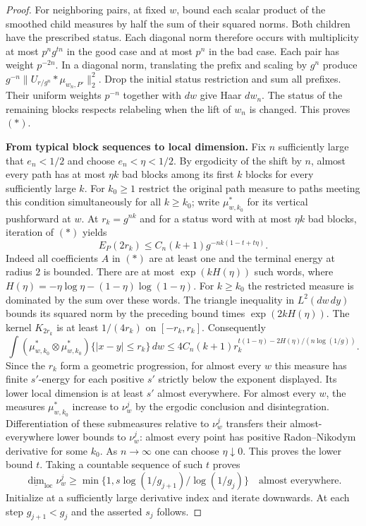 \documentclass[11pt,a4paper]{article}
\begin{document}
\begin{proof}
For neighboring pairs, at fixed $w$, bound each scalar product
of the smoothed child measures by half the sum of their squared
norms. Both children have the prescribed status. Each diagonal
norm therefore occurs with multiplicity at most $p^n g^{tn}$ in
the good case and at most $p^n$ in the bad case. Each pair has
weight $p^{-2n}$. In a diagonal norm, translating the prefix and
scaling by $g^n$ produce $g^{-n}\|U_{r/g^n}*\mu_{w_n,P'}\|_2^2$.
Drop the initial status restriction and sum all prefixes. Their
uniform weights $p^{-n}$ together with $dw$ give Haar $dw_n$.
The status of the remaining blocks respects relabeling when the lift
of $w_n$ is changed. This proves $(*)$.

\par\smallskip\noindent\textbf{From typical block sequences to local dimension.}\enspace
Fix $n$ sufficiently large that $e_n<1/2$ and choose $e_n<\eta<1/2$.
By ergodicity of the shift by $n$, almost every path has at most
$\eta k$ bad blocks among its first $k$ blocks for every sufficiently
large $k$. For $k_0\ge1$ restrict the original path measure to paths
meeting this condition simultaneously for all $k\ge k_0$; write
$\mu_{w,k_0}^*$ for its vertical pushforward at $w$. At $r_k=g^{nk}$
and for a status word with at most $\eta k$ bad blocks, iteration
of $(*)$ yields
\[
  E_P(2r_k)\le C_n(k+1)g^{-nk(1-t+t\eta)} .
\]
Indeed all coefficients $A$ in $(*)$ are at least one and the
terminal energy at radius $2$ is bounded. There are at most
$\exp(k H(\eta))$ such words, where
$H(\eta)=-\eta\log\eta-(1-\eta)\log(1-\eta)$. For $k\ge k_0$ the
restricted measure is dominated by the sum over these words. The
triangle inequality in $L^2(dw\,dy)$ bounds its squared norm by the
preceding bound times $\exp(2kH(\eta))$. The kernel $K_{2r_k}$ is
at least $1/(4r_k)$ on $[-r_k,r_k]$. Consequently
\[
 \int (\mu^*_{w,k_0}\otimes\mu^*_{w,k_0})\{|x-y|\le r_k\}\,dw
 \le 4 C_n(k+1)r_k^{t(1-\eta)-2H(\eta)/(n\log(1/g))}.
\]
Since the $r_k$ form a geometric progression, for almost every $w$
this measure has finite $s'$-energy for each positive $s'$ strictly
below the exponent displayed. Its lower local dimension is at least
$s'$ almost everywhere. For almost every $w$, the measures
$\mu^*_{w,k_0}$ increase to $\nu^j_w$ by the ergodic conclusion and
disintegration. Differentiation of these submeasures relative to
$\nu^j_w$ transfers their almost-everywhere lower bounds to
$\nu^j_w$: almost every point has positive Radon--Nikodym derivative
for some $k_0$. As $n\to\infty$ one can choose $\eta\downarrow0$.
This proves the lower bound $t$. Taking a countable sequence of such
$t$ proves
\[
  \underline{\dim}_{\mathrm{loc}}\nu^j_w
       \ge \min\{1,s\log(1/g_{j+1})/\log(1/g_j)\}
       \quad\text{almost everywhere}.
\]
Initialize at a sufficiently large derivative index and iterate
downwards. At each step $g_{j+1}<g_j$ and the asserted $s_j$ follows.
\end{proof}
\end{document}
